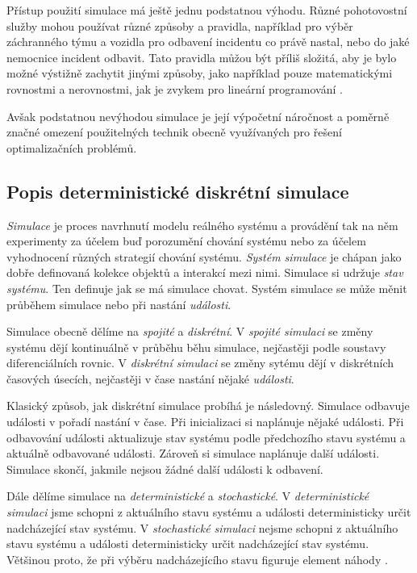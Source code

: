Přístup použití simulace má ještě jednu podstatnou výhodu.
Různé pohotovostní služby mohou používat různé způsoby a pravidla, například pro výběr záchranného týmu a vozidla pro odbavení incidentu co právě nastal, nebo do jaké nemocnice incident odbavit.
Tato pravidla můžou být příliš složitá, aby je bylo možné výstižně zachytit jinými způsoby, jako například pouze matematickými rovnostmi a nerovnostmi, jak je zvykem pro lineární programování \cite{LP}.

Avšak podstatnou nevýhodou simulace je její výpočetní náročnost a poměrně značné omezení použitelných technik obecně využívaných pro řešení optimalizačních problémů.

\subsection{Popis deterministické diskrétní simulace}

\textit{Simulace} je proces navrhnutí modelu reálného systému a provádění tak na něm experimenty za účelem buď porozumění chování systému
nebo za účelem vyhodnocení různých strategií chování systému.
\textit{Systém simulace} je chápan jako dobře definovaná kolekce objektů a interakcí mezi nimi.
Simulace si udržuje \textit{stav systému}. Ten definuje jak se má simulace chovat.
Systém simulace se může měnit průběhem simulace nebo při nastání \textit{události}.

Simulace obecně dělíme na \textit{spojité} a \textit{diskrétní}.
V \textit{spojité simulaci} se změny systému dějí kontinuálně v průběhu běhu simulace, nejčastěji podle soustavy diferenciálních rovnic.
V \textit{diskrétní simulaci} se změny sytému dějí v diskrétních časových úsecích, nejčastěji v čase nastání nějaké \textit{události}.

Klasický způsob, jak diskrétní simulace probíhá je následovný.
Simulace odbavuje události v pořadí nastání v čase.
Při inicializaci si naplánuje nějaké události.
Při odbavování události aktualizuje stav systému podle předchozího stavu systému a aktuálně odbavované události. Zároveň si simulace naplánuje další události. 
Simulace skončí, jakmile nejsou žádné další události k odbavení.

Dále dělíme simulace na \textit{deterministické} a \textit{stochastické}.
V \textit{deterministické simulaci} jsme schopni z aktuálního stavu systému a události deterministicky určit nadcházející stav systému.
V \textit{stochastické simulaci} nejsme schopni z aktuálního stavu systému a události deterministicky určit nadcházející stav systému.
Většinou proto, že při výběru nadcházejícího stavu figuruje element náhody \cite{SimulaceBook}.

